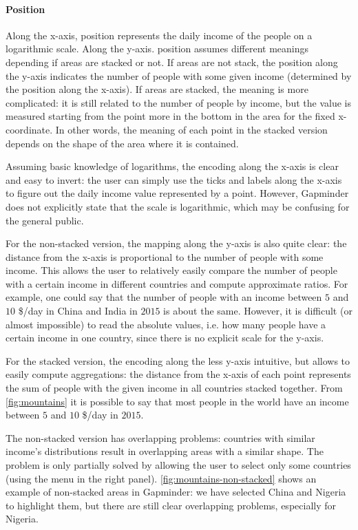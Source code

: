 \paragraph{Position}
Along the x-axis, position represents the daily income of the people on a logarithmic scale.
Along the y-axis. position assumes different meanings depending if areas are stacked or not.
If areas are not stack, the position along the y-axis indicates the number of people with some given income (determined by the position along the x-axis).
If areas are stacked, the meaning is more complicated:
it is still related to the number of people by income, but the value is measured starting from the point more in the bottom in the area for the fixed x-coordinate.
In other words, the meaning of each point in the stacked version depends on the shape of the area where it is contained.

Assuming basic knowledge of logarithms, the encoding along the x-axis is clear and easy to invert:
the user can simply use the ticks and labels along the x-axis to figure out the daily income value represented by a point.
However, Gapminder does not explicitly state that the scale is logarithmic, which may be confusing for the general public.

For the non-stacked version, the mapping along the y-axis is also quite clear:
the distance from the x-axis is proportional to the number of people with some income.
This allows the user to relatively easily compare the number of people with a certain income in different countries and compute approximate ratios.
For example, one could say that the number of people with an income between $5$ and $10$ \$/day in China and India in $2015$ is about the same.
However, it is difficult (or almost impossible) to read the absolute values, i.e. how many people have a certain income in one country, since there is no explicit scale for the y-axis.

For the stacked version, the encoding along the less y-axis intuitive, but allows to easily compute aggregations:
the distance from the x-axis of each point represents the sum of people with the given income in all countries stacked together.
From \cref{fig:mountains} it is possible to say that most people in the world have an income between $5$ and $10$ \$/day in $2015$.

The non-stacked version has overlapping problems:
countries with similar income's distributions result in overlapping areas with a similar shape.
The problem is only partially solved by allowing the user to select only some countries (using the menu in the right panel).
\cref{fig:mountains-non-stacked} shows an example of non-stacked areas in Gapminder:
we have selected China and Nigeria to highlight them, but there are still clear overlapping problems, especially for Nigeria.

